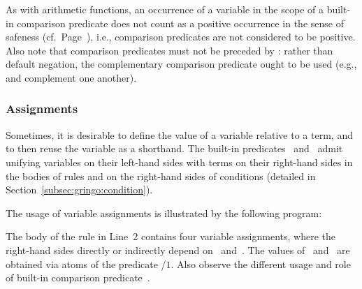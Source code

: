 \begin{Note}
As with arithmetic functions,
an occurrence of a variable in the scope of a built-in comparison predicate
does not count as a positive occurrence in the sense of safeness (cf.\ Page~\pageref{pg:safe}),
i.e.,
comparison predicates are not considered to be positive.
Also note that comparison predicates must not be preceded by :
rather than default negation,
the complementary comparison predicate ought to be used
(e.g., \code{<} and \code{>=} complement one another).
%
\end{Note}

\subsubsection{Assignments}\label{subsec:gringo:assign}

Sometimes, it is desirable to define the value of a variable relative
to a term, and to then reuse the variable as a shorthand.
The built-in predicates~\code{=} and~\code{:=} admit unifying
variables on their left-hand sides with terms on their right-hand sides
in the bodies of rules and on the right-hand sides of conditions
(detailed in Section~\ref{subsec:gringo:condition}).

\begin{example}\label{ex:assign}
The usage of variable assignments is illustrated by the following program:%
%
%

%
The body of the rule in Line~2 contains four variable assignments,
where the right-hand sides directly or indirectly
depend on~ and~.
The values of~ and~ are obtained via atoms of the predicate /$1$.
Also observe the different usage and role of built-in comparison predicate~\code{==}.
\eexample
\end{example}

